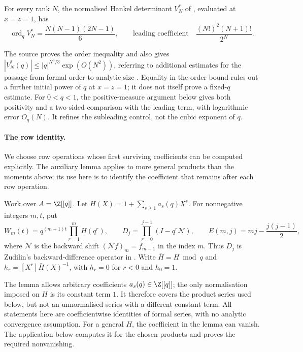 \begin{theorem}\label{long1049:res:zudilin-sharp-qorder}
For every rank $N$, the normalised Hankel determinant $V_N^{*}$ of
\cite[Sec.~4, (6), p.~6]{zudilin2016}, evaluated at $x=z=1$, has
\[
 \operatorname{ord}_q V_N^{*}=\frac{N(N-1)(2N-1)}{6},
 \qquad
 \text{leading coefficient}\quad\frac{(N!)^{2}(N+1)!}{2^{N}} .
\]
\end{theorem}

\noindent The source proves the order inequality and also gives
$|V_N^*(q)|\le |q|^{N^3/3}\exp(O(N^2))$, referring to additional estimates
for the passage from formal order to analytic size
\cite[Sec.~4, p.~7]{zudilin2016}.
Equality in the order bound rules out a further initial power of $q$ at
$x=z=1$; it does not itself prove a fixed-$q$ estimate.
For $0<q<1$, the positive-measure argument below gives both positivity
and a two-sided comparison with the leading term, with logarithmic error
$O_q(N)$. It refines the subleading control, not the cubic exponent of $q$.

\paragraph{The row identity.}
We choose row operations whose first surviving coefficients can be
computed explicitly. The auxiliary lemma applies to more general
products than the moments above; its use here is to identify the
coefficient that remains after each row operation.

Work over $A=\Z[[q]]$. Let $H(X)=1+\sum_{s\ge1}a_s(q)X^s$.
For nonnegative integers $m,t$, put
\[
 W_m(t)=q^{(m+1)t}\prod_{r=1}^{m}H(q^{r}),
 \qquad
 D_j=\prod_{r=0}^{j-1}(I-q^{r}\mathcal N),
 \qquad
 E(m,j)=mj-\frac{j(j-1)}2,
\]
where $\mathcal N$ is the backward shift $(\mathcal Nf)_m=f_{m-1}$ in the index
$m$. Thus $D_j$ is Zudilin's backward-difference operator in
\cite[Sec.~4, (7), p.~6]{zudilin2016}.  Write $\bar H=H\bmod q$ and
$h_r=[X^{r}]\bar H(X)^{-1}$, with $h_r=0$ for $r<0$ and $h_0=1$.

The lemma allows arbitrary coefficients $a_s(q)\in\Z[[q]]$; the only
normalisation imposed on $H$ is its constant term $1$. It therefore
covers the product series used below, but not an unnormalised series
with a different constant term. All statements here are coefficientwise
identities of formal series, with no analytic convergence assumption.
For a general $H$, the coefficient in the lemma can vanish. The
application below computes it for the chosen products and proves the
required nonvanishing.

